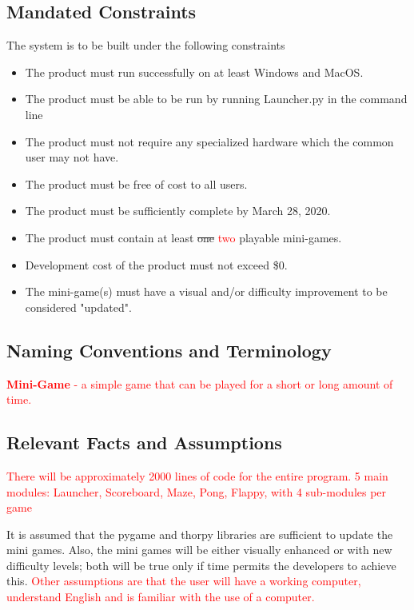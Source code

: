 \documentclass[12pt, titlepage]{article}
\begin{document}
\subsection{Mandated Constraints}

The system is to be built under the following constraints

\begin{itemize}
    \item The product must run successfully on at least Windows and MacOS.
    \item The product must be able to be run by running Launcher.py in the command line
    \item The product must not require any specialized hardware which the common user may not have.
    \item The product must be free of cost to all users.
    \item The product must be sufficiently complete by March 28, 2020.
    \item The product must contain at least \sout{one} \textcolor{red}{two} playable mini-games.
    \item Development cost of the product must not exceed \$0.
    \item The mini-game(s) must have a visual and/or difficulty improvement to be considered "updated".
\end{itemize}

\subsection{Naming Conventions and Terminology}

\textcolor{red}{\textbf{Mini-Game} - a simple game that can be played for a short or long amount of time.}

\subsection{Relevant Facts and Assumptions}

\textcolor{red}{There will be approximately 2000 lines of code for the entire program. 5 main modules: Launcher, Scoreboard, Maze, Pong, Flappy, with 4 sub-modules per game}

It is assumed that the pygame and thorpy libraries are sufficient to update the mini games. Also, the mini games will be either visually enhanced or with new difficulty levels; both will be true only if time permits the developers to achieve this. \textcolor{red}{Other assumptions are that the user will have a working computer, understand English and is familiar with the use of a computer.}
\end{document}
